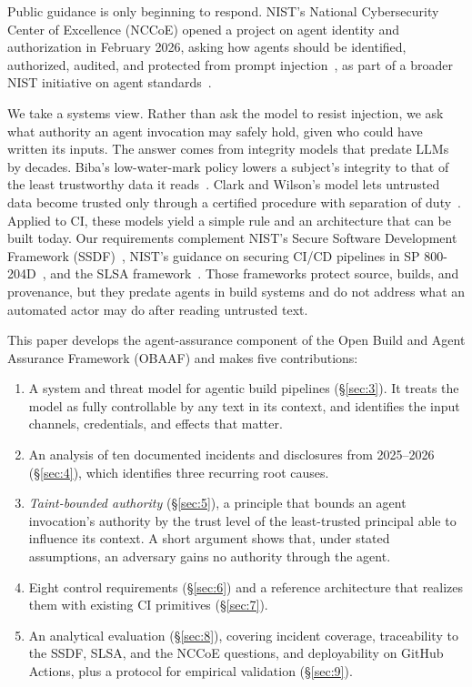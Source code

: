 \documentclass[acmsmall,screen,review]{acmart}
\begin{document}
Public guidance is only beginning to respond. NIST's National Cybersecurity Center of Excellence (NCCoE) opened a project on agent identity and authorization in February 2026, asking how agents should be identified, authorized, audited, and protected from prompt injection~\cite{booth2026accelerating}, as part of a broader NIST initiative on agent standards~\cite{national2026announcing}.

We take a systems view. Rather than ask the model to resist injection, we ask what authority an agent invocation may safely hold, given who could have written its inputs. The answer comes from integrity models that predate LLMs by decades. Biba's low-water-mark policy lowers a subject's integrity to that of the least trustworthy data it reads~\cite{biba1977integrity}. Clark and Wilson's model lets untrusted data become trusted only through a certified procedure with separation of duty~\cite{clark1987comparison}. Applied to CI, these models yield a simple rule and an architecture that can be built today. Our requirements complement NIST's Secure Software Development Framework (SSDF)~\cite{souppaya2022secure,booth2025secure}, NIST's guidance on securing CI/CD pipelines in SP 800-204D~\cite{chandramouli2024strategies}, and the SLSA framework~\cite{openndslsa}. Those frameworks protect source, builds, and provenance, but they predate agents in build systems and do not address what an automated actor may do after reading untrusted text.

This paper develops the agent-assurance component of the Open Build and Agent Assurance Framework (OBAAF) and makes five contributions:

\begin{enumerate}
\item A system and threat model for agentic build pipelines (\S\ref{sec:3}). It treats the model as fully controllable by any text in its context, and identifies the input channels, credentials, and effects that matter.
\item An analysis of ten documented incidents and disclosures from 2025–2026 (\S\ref{sec:4}), which identifies three recurring root causes.
\item \emph{Taint-bounded authority} (\S\ref{sec:5}), a principle that bounds an agent invocation's authority by the trust level of the least-trusted principal able to influence its context. A short argument shows that, under stated assumptions, an adversary gains no authority through the agent.
\item Eight control requirements (\S\ref{sec:6}) and a reference architecture that realizes them with existing CI primitives (\S\ref{sec:7}).
\item An analytical evaluation (\S\ref{sec:8}), covering incident coverage, traceability to the SSDF, SLSA, and the NCCoE questions, and deployability on GitHub Actions, plus a protocol for empirical validation (\S\ref{sec:9}).
\end{enumerate}
\end{document}
